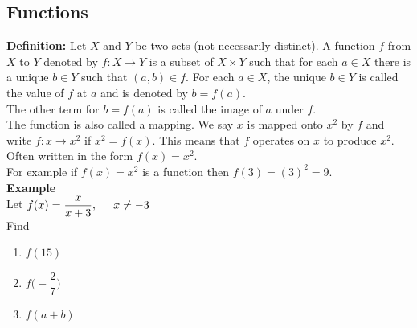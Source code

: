 \documentclass[11pt,a4paper]{article}
\begin{document}
\begin{figure}[H]
\centering
{}
\end{figure}
\vspace{1cm}








\subsection{Functions}
\textbf{Definition:} Let $X$ and $Y$ be two sets (not necessarily distinct). A function $f$ from $X$ to $Y$ denoted by $f:X\longrightarrow Y$ is a subset of $X\times Y$ such that for each $a\in X$ there is a unique $b\in Y$ such that $(a,b)\in f$. For each $a\in X$, the unique $b\in Y$ is called the value of $f$ at $a$ and is denoted by $b=f(a)$.\\
The other term for $b=f(a)$ is called the image of $a$ under $f$.\\
The function is also called a mapping. We say $x$ is mapped onto $x^2$ by $f$ and write $f:x\longrightarrow x^2$ if $x^2=f(x)$. This means that $f$ operates on $x$ to produce $x^2$. Often written in the form $f(x)=x^2$.\\

For example if $f(x)=x^2$ is a function then $f(3)=(3)^2=9$.\\

\textbf{Example}\\
Let $f(x)=\dfrac{x}{x+3},\hspace{0.5cm} x\neq -3$\\

Find 
\begin{enumerate}
\item $f(15)$
\item $f\bigg(-\dfrac{2}{7}\bigg)$
\item $f(a+b)$\\
\end{enumerate}
\end{document}
